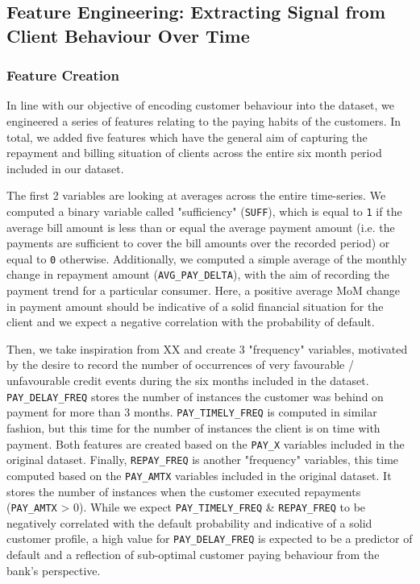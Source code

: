 \documentclass{article}
\newcommand{\code}{\texttt}
\begin{document}
\subsection{Feature Engineering: Extracting Signal from Client Behaviour Over Time}
\label{sec:feature_eng}

\subsubsection{Feature Creation}

In line with our objective of encoding customer behaviour into the dataset, we engineered a series of features relating to the paying habits of the customers. In total, we added five features which have the general aim of capturing the repayment and billing situation of clients across the entire six month period included in our dataset.

The first 2 variables are looking at averages across the entire time-series. We computed a binary variable called "sufficiency" (\code{SUFF}), which is equal to \code{1} if the average bill amount is less than or equal the average payment amount (i.e. the payments are sufficient to cover the bill amounts over the recorded period) or equal to \code{0} otherwise. Additionally, we computed a simple average of the monthly change in repayment amount (\code{AVG\_PAY\_DELTA}), with the aim of recording the payment trend for a particular consumer. Here, a positive average MoM change in payment amount should be indicative of a solid financial situation for the client and we expect a negative correlation with the probability of default.

Then, we take inspiration from XX and create 3 "frequency" variables, motivated by the desire to record the number of occurrences of very favourable / unfavourable credit events during the six months included in the dataset. \code{PAY\_DELAY\_FREQ} stores the number of instances the customer was behind on payment for more than 3 months. \code{PAY\_TIMELY\_FREQ} is computed in similar fashion, but this time for the number of instances the client is on time with payment. Both features are created based on the \code{PAY\_X} variables included in the original dataset. Finally, \code{REPAY\_FREQ} is another "frequency" variables, this time computed based on the \code{PAY\_AMTX} variables included in the original dataset. It stores the number of instances when the customer executed repayments (\code{PAY\_AMTX} > 0). While we expect \code{PAY\_TIMELY\_FREQ} \& \code{REPAY\_FREQ} to be negatively correlated with the default probability and indicative of a solid customer profile, a high value for \code{PAY\_DELAY\_FREQ} is expected to be a predictor of default and a reflection of sub-optimal customer paying behaviour from the bank's perspective.
\end{document}
